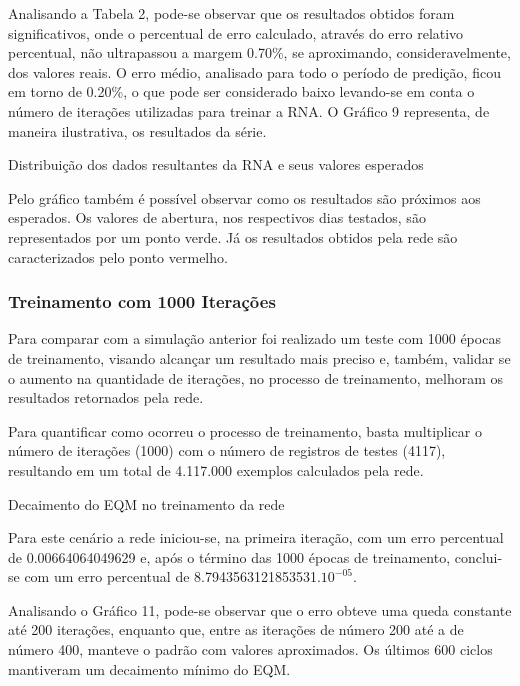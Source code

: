 Analisando a Tabela 2, pode-se observar que os resultados obtidos foram significativos, onde o percentual de erro calculado, através do erro relativo percentual, não ultrapassou a margem 0.70\%, se aproximando, consideravelmente, dos valores reais. O erro médio, analisado para todo o período de predição, ficou em torno de 0.20\%, o que pode ser considerado baixo levando-se em conta o número de iterações utilizadas para treinar a RNA. O Gráfico 9 representa, de maneira ilustrativa, os resultados da série.
\begin{grafico}[h]
	\centering
	\caption{Distribuição dos dados resultantes da RNA e seus valores esperados}
	\label{lingua}
\end{grafico}

Pelo gráfico também é possível observar como os resultados são próximos aos esperados. Os valores de abertura, nos respectivos dias testados, são representados por um ponto verde. Já os resultados obtidos pela rede são caracterizados pelo ponto vermelho. 

\subsubsection{Treinamento com 1000 Iterações}	
Para comparar com a simulação anterior foi realizado um teste com 1000 épocas de treinamento, visando alcançar um resultado mais preciso e, também, validar se o aumento na quantidade de iterações, no processo de treinamento, melhoram os resultados retornados pela rede.

Para quantificar como ocorreu o processo de treinamento, basta multiplicar o número de iterações (1000) com o número de registros de testes (4117), resultando em um total de 4.117.000 exemplos calculados pela rede.
\begin{grafico}[h]
	\centering
	\caption{Decaimento do EQM no treinamento da rede}
	\label{lingua}
\end{grafico}

Para este cenário a rede iniciou-se, na primeira iteração, com um erro percentual de 0.00664064049629 e, após o término das 1000 épocas de treinamento, conclui-se com um erro percentual de 8.7943563121853531.$10^{-05}$. 

Analisando o Gráfico 11, pode-se observar que o erro obteve uma queda constante até 200 iterações, enquanto que, entre as iterações de número 200 até a de número 400, manteve o padrão com valores aproximados. Os últimos 600 ciclos mantiveram um decaimento mínimo do EQM.

